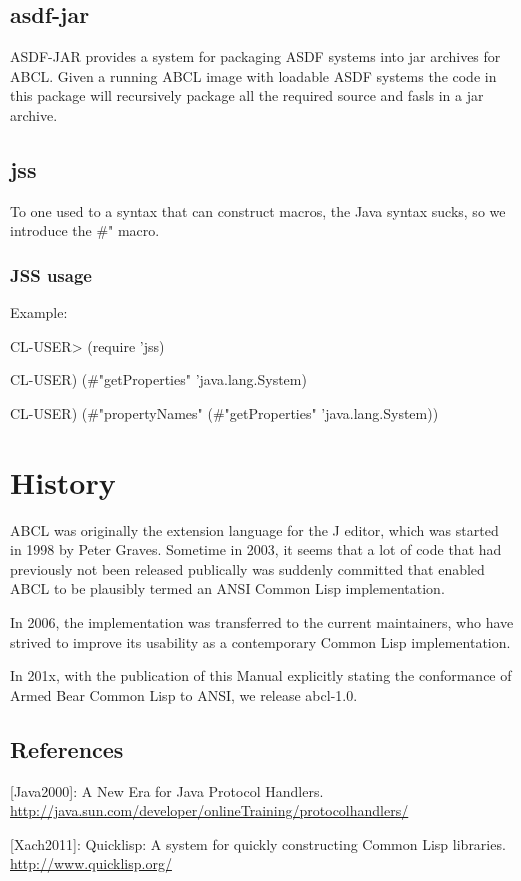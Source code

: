 \documentclass[10pt]{book}
\begin{document}
\section{asdf-jar}

ASDF-JAR provides a system for packaging ASDF systems into jar
archives for ABCL.  Given a running ABCL image with loadable ASDF
systems the code in this package will recursively package all the
required source and fasls in a jar archive.

\section{jss}

To one used to a syntax that can construct macros, the Java syntax
sucks, so we introduce the \#" macro.

\subsection{JSS usage}

Example:

\begin{listing-lisp}
  CL-USER> (require 'jss)

  CL-USER) (#"getProperties" 'java.lang.System)

  CL-USER) (#"propertyNames" (#"getProperties" 'java.lang.System))
\end{listing-lisp}

\chapter{History}

ABCL was originally the extension language for the J editor, which was
started in 1998 by Peter Graves.  Sometime in 2003, it seems that a
lot of code that had previously not been released publically was
suddenly committed that enabled ABCL to be plausibly termed an ANSI
Common Lisp implementation.

In 2006, the implementation was transferred to the current
maintainers, who have strived to improve its usability as a
contemporary Common Lisp implementation.

In 201x, with the publication of this Manual explicitly stating the
conformance of Armed Bear Common Lisp to ANSI, we release abcl-1.0.




\section{References}

[Java2000]:  A New Era for Java Protocol Handlers.
\url{http://java.sun.com/developer/onlineTraining/protocolhandlers/}

[Xach2011]:  Quicklisp:  A system for quickly constructing Common Lisp
libraries.  \url{http://www.quicklisp.org/}
\end{document}
